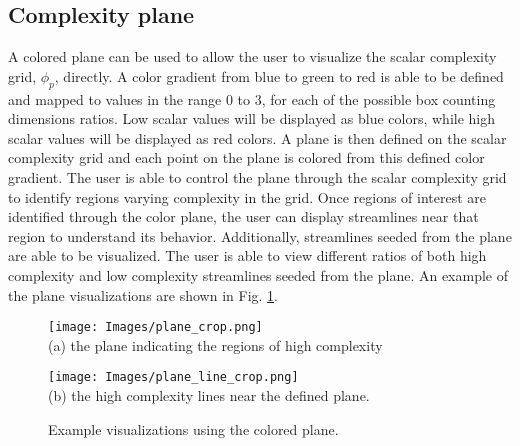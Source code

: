 \documentclass{egpubl}
\begin{document}
\subsection{Complexity plane}
A colored plane can be used to allow the user to visualize the scalar complexity grid, $\phi_p$, directly.
A color gradient from blue to green to red is able to be defined and mapped to values in the range 0 to 3, for each of the possible box counting dimensions ratios.
Low scalar values will be displayed as blue colors, while high scalar values will be displayed as red colors.
A plane is then defined on the scalar complexity grid and each point on the plane is colored from this defined color gradient.
The user is able to control the plane through the scalar complexity grid to identify regions varying complexity in the grid.
Once regions of interest are identified through the color plane, the user can display streamlines near that region to understand its behavior.
Additionally, streamlines seeded from the plane are able to be visualized.
The user is able to view different ratios of both high complexity and low complexity streamlines seeded from the plane.
An example of the plane visualizations are shown in Fig. \ref{fig:plane}.

\begin{figure}[h]
        \centering
                \begin{minipage}{0.45\linewidth}
                        \small
                        \texttt{[image: Images/plane\_crop.png]}\\(a) the plane indicating the regions of high complexity\vspace{0.2em}
                \end{minipage}
                \begin{minipage}{0.45\linewidth}
                        \small
                        \texttt{[image: Images/plane\_line\_crop.png]}\\(b) the high complexity lines near the defined plane.\vspace{0.2em}
                \end{minipage}
        \caption{Example visualizations using the colored plane.}
        \label{fig:plane}
\end{figure}
\end{document}
